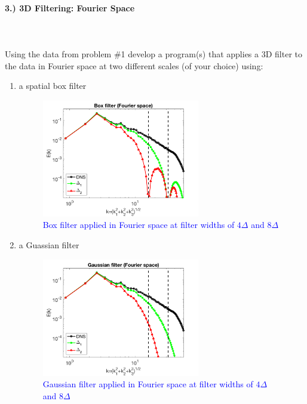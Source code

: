 \documentclass[11pt]{article}
\begin{document}
\paragraph{3.) 3D Filtering: Fourier Space}~\\\\
Using the data from problem \#1 develop a program(s) that applies a 3D filter to the data in Fourier space at two different scales (of your choice) using:
\begin{enumerate}[label=(\alph*),topsep=-10pt]
	\item a spatial box filter
	\begin{figure}[H]
	\centering
	\includegraphics[width=0.65\textwidth]{spectral_box}
	~\\\textcolor{blue}{Box filter applied in Fourier space at filter widths of $4\Delta$ and $8\Delta$}
	\end{figure}
	\item a Guassian filter
	\begin{figure}[H]
	\centering
	\includegraphics[width=0.65\textwidth]{spectral_gaussian}
	~\\\textcolor{blue}{Gaussian filter applied in Fourier space at filter widths of $4\Delta$ and $8\Delta$}
	\end{figure}

\end{enumerate}
\end{document}

